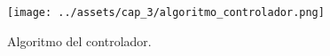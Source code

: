 \begin{figure}[!ht]
    \centering
    \texttt{[image: ../assets/cap\_3/algoritmo\_controlador.png]}
    \caption{Algoritmo del controlador.}
    \label{fig:algoritmo_controlador}
\end{figure}